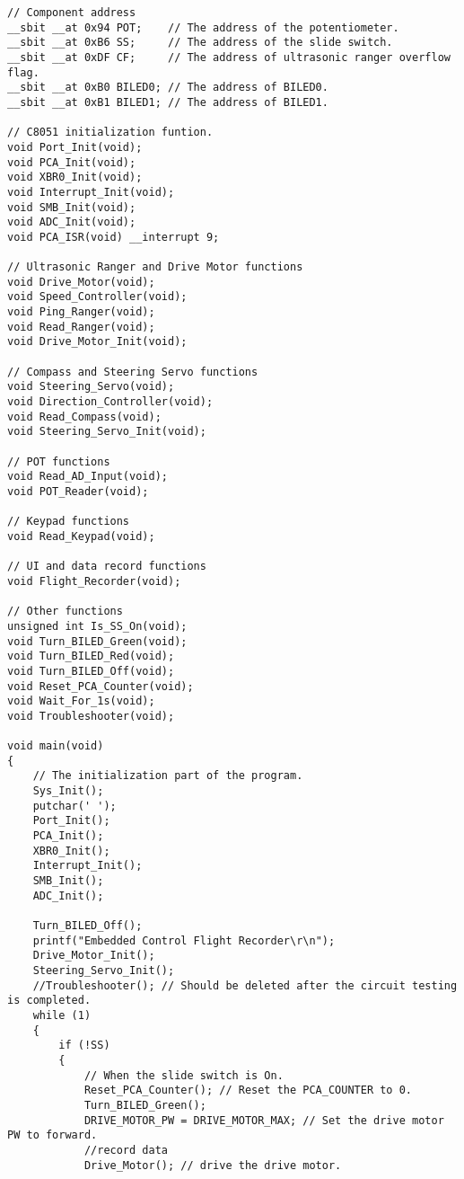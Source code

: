 \documentclass[12pt]{article}
\begin{document}
\begin{lstlisting}
// Component address
__sbit __at 0x94 POT;    // The address of the potentiometer.
__sbit __at 0xB6 SS;     // The address of the slide switch.
__sbit __at 0xDF CF;     // The address of ultrasonic ranger overflow flag.
__sbit __at 0xB0 BILED0; // The address of BILED0.
__sbit __at 0xB1 BILED1; // The address of BILED1.

// C8051 initialization funtion.
void Port_Init(void);
void PCA_Init(void);
void XBR0_Init(void);
void Interrupt_Init(void);
void SMB_Init(void);
void ADC_Init(void);
void PCA_ISR(void) __interrupt 9;

// Ultrasonic Ranger and Drive Motor functions
void Drive_Motor(void);
void Speed_Controller(void);
void Ping_Ranger(void);
void Read_Ranger(void);
void Drive_Motor_Init(void);

// Compass and Steering Servo functions
void Steering_Servo(void);
void Direction_Controller(void);
void Read_Compass(void);
void Steering_Servo_Init(void);

// POT functions
void Read_AD_Input(void);
void POT_Reader(void);

// Keypad functions
void Read_Keypad(void);

// UI and data record functions
void Flight_Recorder(void);

// Other functions
unsigned int Is_SS_On(void);
void Turn_BILED_Green(void);
void Turn_BILED_Red(void);
void Turn_BILED_Off(void);
void Reset_PCA_Counter(void);
void Wait_For_1s(void);
void Troubleshooter(void);

void main(void)
{
    // The initialization part of the program.
    Sys_Init();
    putchar(' ');
    Port_Init();
    PCA_Init();
    XBR0_Init();
    Interrupt_Init();
    SMB_Init();
    ADC_Init();

    Turn_BILED_Off();
    printf("Embedded Control Flight Recorder\r\n");
    Drive_Motor_Init();
    Steering_Servo_Init();
    //Troubleshooter(); // Should be deleted after the circuit testing is completed.
    while (1)
    {
        if (!SS)
        {
            // When the slide switch is On.
            Reset_PCA_Counter(); // Reset the PCA_COUNTER to 0.
            Turn_BILED_Green();
            DRIVE_MOTOR_PW = DRIVE_MOTOR_MAX; // Set the drive motor PW to forward.
            //record data
            Drive_Motor(); // drive the drive motor.


\end{lstlisting}
\end{document}
